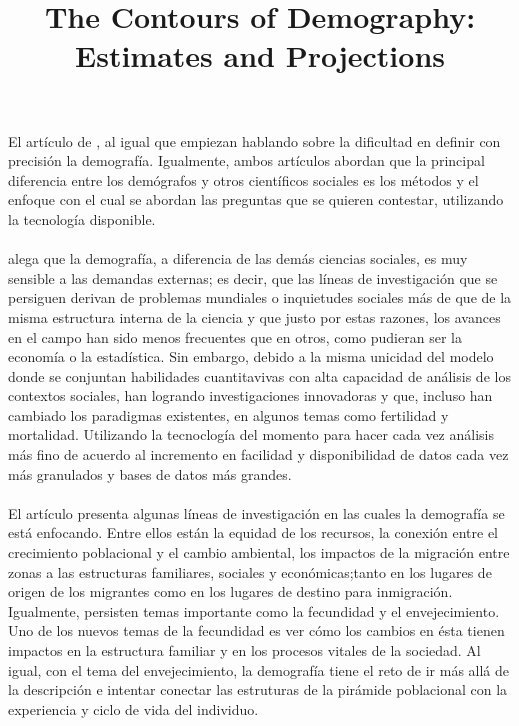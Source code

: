 \documentclass[11pt,spanish,letterpaper]{article}
\theoremstyle{plain}
\begin{document}
\title{The Contours of Demography: Estimates and Projections}
\date{}
\maketitle
El art\'iculo de \cite{preston1993contours}, al igual que \cite{caldwell1996demography} empiezan hablando sobre la dificultad en definir con precisi\'on la demograf\'ia. Igualmente, ambos art\'iculos abordan que la principal diferencia entre los dem\'ografos y otros cient\'ificos sociales es los m\'etodos y el enfoque con el cual se abordan las preguntas que se quieren contestar, utilizando la tecnolog\'ia disponible.\\
\\
\cite{preston1993contours} alega que la demograf\'ia, a diferencia de las dem\'as ciencias sociales, es muy sensible a las demandas externas; es decir, que las l\'ineas de investigaci\'on que se persiguen derivan de problemas mundiales o inquietudes sociales m\'as de que de la misma estructura interna de la ciencia y que justo por estas razones, los avances en el campo han sido menos frecuentes que en otros, como pudieran ser la econom\'ia o la estad\'istica. Sin embargo, debido a la misma unicidad del modelo donde se conjuntan habilidades cuantitavivas con alta capacidad de an\'alisis de los contextos sociales, han logrando investigaciones innovadoras y que, incluso han cambiado los paradigmas existentes, en algunos temas como fertilidad y mortalidad. Utilizando la tecnoclog\'ia del momento para hacer cada vez an\'alisis m\'as fino de acuerdo al incremento en facilidad y disponibilidad de datos cada vez m\'as granulados y bases de datos m\'as grandes.\\
\\
El art\'iculo presenta algunas l\'ineas de investigaci\'on en las cuales la demograf\'ia se est\'a enfocando. Entre ellos est\'an la equidad de los recursos, la conexi\'on entre el crecimiento poblacional y el cambio ambiental, los impactos de la migraci\'on entre zonas a las estructuras familiares, sociales y econ\'omicas;tanto en los lugares de origen de los migrantes como en los lugares de destino para inmigraci\'on. Igualmente, persisten temas importante como la fecundidad y el envejecimiento. Uno de los nuevos temas de la fecundidad es ver c\'omo los cambios en \'esta tienen impactos en la estructura familiar y en los procesos vitales de la sociedad. Al igual, con el tema del envejecimiento, la demograf\'ia tiene el reto de ir m\'as all\'a de la descripci\'on e intentar conectar las estruturas de la pir\'amide poblacional con la experiencia y ciclo de vida del individuo.\\
\end{document}
